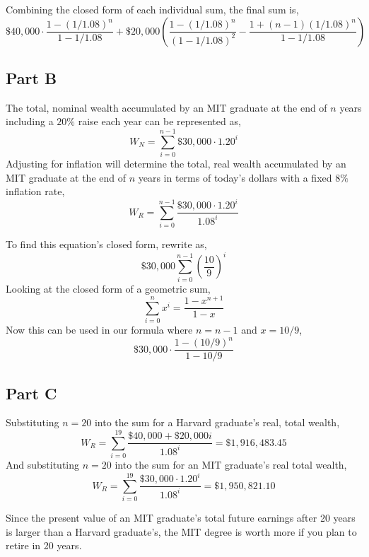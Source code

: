 \documentclass{article}
\begin{document}
Combining the closed form of each individual sum, the final sum is,
$$ \$40,000 \cdot \frac{1 - (1/1.08)^n}{1 - 1/1.08} + \$20,000 \left(
\frac{1 - (1/1.08)^n}{(1 - 1/1.08)^2} - \frac{1 + (n - 1) (1/1.08)^n}{1 -
1/1.08}\right) $$

\break

\subsection*{Part B}

The total, nominal wealth accumulated by an MIT graduate at the end of  $n$
years including a $20\%$ raise each year can be represented as,
$$ W_N = \sum\limits_{i = 0}^{n - 1} \$30,000 \cdot 1.20^i $$
Adjusting for inflation will determine the total, real wealth accumulated by an
MIT graduate at the end of $n$ years in terms of today's dollars with a fixed
$8\%$ inflation rate,
$$ W_R = \sum\limits_{i = 0}^{n - 1} \frac{\$30,000 \cdot 1.20^i}{1.08^i} $$

To find this equation's closed form, rewrite as,
$$ \$30,000 \sum\limits_{i = 0}^{n - 1} \left(\frac{10}{9}\right)^i $$
Looking at the closed form of a geometric sum,
$$ \sum\limits_{i = 0}^n x^i = \frac{1 - x^{n + 1}}{1 - x} $$
Now this can be used in our formula where $n = n - 1$ and $x = 10/9$,
$$ \$30,000 \cdot \frac{1 - (10/9)^n}{1 - 10/9} $$

\break

\subsection*{Part C}

Substituting $n = 20$ into the sum for a Harvard graduate's real, total wealth,
$$ W_R = \sum\limits_{i = 0}^{19} \frac{\$40,000 + \$20,000 i}{1.08^i} =
\$1,916,483.45 $$
And substituting $n = 20$ into the sum for an MIT graduate's real total wealth,
$$ W_R = \sum\limits_{i = 0}^{19} \frac{\$30,000 \cdot 1.20^i}{1.08^i} =
\$1,950,821.10 $$

Since the present value of an MIT graduate's total future earnings after 20
years is larger than a Harvard graduate's, the MIT degree is worth more if you
plan to retire in 20 years.
\end{document}
